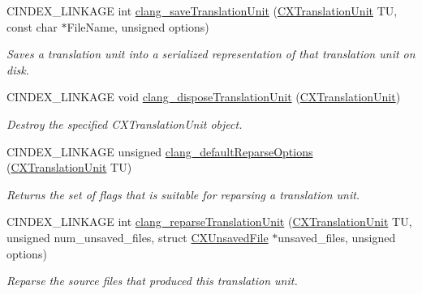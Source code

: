 \begin{DoxyCompactItemize}
C\+I\+N\+D\+E\+X\+\_\+\+L\+I\+N\+K\+A\+GE int \mbox{\hyperlink{group__CINDEX__TRANSLATION__UNIT_ga3abe9df81f9fef269d737d82720c1d33}{clang\+\_\+save\+Translation\+Unit}} (\mbox{\hyperlink{group__CINDEX_gacdb7815736ca709ce9a5e1ec2b7e16ac}{C\+X\+Translation\+Unit}} TU, const char $\ast$File\+Name, unsigned options)
\begin{DoxyCompactList}\small\item\em Saves a translation unit into a serialized representation of that translation unit on disk. \end{DoxyCompactList}\item 
\mbox{\label{group__CINDEX__TRANSLATION__UNIT_gaee753cb0036ca4ab59e48e3dff5f530a}} 
C\+I\+N\+D\+E\+X\+\_\+\+L\+I\+N\+K\+A\+GE void \mbox{\hyperlink{group__CINDEX__TRANSLATION__UNIT_gaee753cb0036ca4ab59e48e3dff5f530a}{clang\+\_\+dispose\+Translation\+Unit}} (\mbox{\hyperlink{group__CINDEX_gacdb7815736ca709ce9a5e1ec2b7e16ac}{C\+X\+Translation\+Unit}})
\begin{DoxyCompactList}\small\item\em Destroy the specified C\+X\+Translation\+Unit object. \end{DoxyCompactList}\item 
C\+I\+N\+D\+E\+X\+\_\+\+L\+I\+N\+K\+A\+GE unsigned \mbox{\hyperlink{group__CINDEX__TRANSLATION__UNIT_gacd29e05f33062a81330fc4a8d255921b}{clang\+\_\+default\+Reparse\+Options}} (\mbox{\hyperlink{group__CINDEX_gacdb7815736ca709ce9a5e1ec2b7e16ac}{C\+X\+Translation\+Unit}} TU)
\begin{DoxyCompactList}\small\item\em Returns the set of flags that is suitable for reparsing a translation unit. \end{DoxyCompactList}\item 
C\+I\+N\+D\+E\+X\+\_\+\+L\+I\+N\+K\+A\+GE int \mbox{\hyperlink{group__CINDEX__TRANSLATION__UNIT_ga524e76bf2a809d037934d4be51ea448a}{clang\+\_\+reparse\+Translation\+Unit}} (\mbox{\hyperlink{group__CINDEX_gacdb7815736ca709ce9a5e1ec2b7e16ac}{C\+X\+Translation\+Unit}} TU, unsigned num\+\_\+unsaved\+\_\+files, struct \mbox{\hyperlink{structCXUnsavedFile}{C\+X\+Unsaved\+File}} $\ast$unsaved\+\_\+files, unsigned options)
\begin{DoxyCompactList}\small\item\em Reparse the source files that produced this translation unit. \end{DoxyCompactList}\item 

\end{DoxyCompactItemize}
